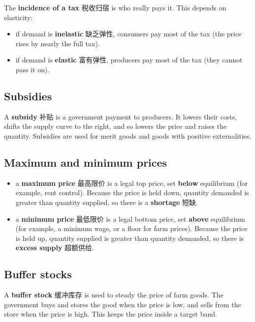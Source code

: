 \documentclass[11pt]{article}
\begin{document}
The \textbf{incidence of a tax} 税收归宿 is who really pays it. This depends on elasticity:

\begin{itemize}
\item if demand is \textbf{inelastic} 缺乏弹性, consumers pay most of the tax (the price rises by nearly the full tax).

\item if demand is \textbf{elastic} 富有弹性, producers pay most of the tax (they cannot pass it on).

\end{itemize}

\subsection*{Subsidies}

A \textbf{subsidy} 补贴 is a government payment to producers. It lowers their costs, shifts the supply curve to the right, and so lowers the price and raises the quantity. Subsidies are used for merit goods and goods with positive externalities.

\subsection*{Maximum and minimum prices}

\begin{itemize}
\item a \textbf{maximum price} 最高限价 is a legal top price, set \textbf{below} equilibrium (for example, rent control). Because the price is held down, quantity demanded is greater than quantity supplied, so there is a \textbf{shortage} 短缺.

\item a \textbf{minimum price} 最低限价 is a legal bottom price, set \textbf{above} equilibrium (for example, a minimum wage, or a floor for farm prices). Because the price is held up, quantity supplied is greater than quantity demanded, so there is \textbf{excess supply} 超额供给.

\end{itemize}

\subsection*{Buffer stocks}

A \textbf{buffer stock} 缓冲库存 is used to steady the price of farm goods. The government buys and stores the good when the price is low, and sells from the store when the price is high. This keeps the price inside a target band.
\end{document}

